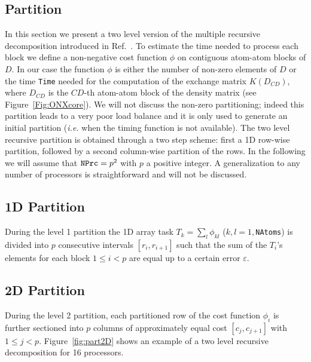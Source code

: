 \documentclass[prl,twocolumn,twocolumngrid,superbib]{revtex4} %
\begin{document}
\subsection{Partition}
 In this section we present a two level version of the multiple recursive 
 decomposition introduced in Ref.~\cite{LRomero95}.
 To estimate the time needed to process each block we define
 a non-negative cost function $\phi$ on contiguous atom-atom blocks of
 $D$. In our case the function $\phi$ is either the number of 
 non-zero elements of $D$ or the time {\tt Time} needed for the computation
 of the exchange matrix $K(D_{CD})$, where $D_{CD}$ is the
 $CD$-th atom-atom block of the density matrix (see Figure~\ref{Fig:ONXcore}).
 We will not discuss the non-zero partitioning;
 indeed this partition leads to a very poor load balance and it is
 only used to generate an initial partition ({\em i.e.} when 
 the timing function is not available). 
 The two level recursive partition is obtained through 
 a two step scheme: first a 1D row-wise partition, followed by a 
 second column-wise partition of the rows.
 In the following we will assume that ${\tt NPrc}=p^2$ with $p$ a positive integer. %
 A generalization to any number of processors is straightforward and will not be discussed.

\subsection{1D Partition}
 During the level 1 partition the 1D array task $T_k=\sum_l\phi_{kl}$ ($k,l=1,${\tt NAtoms})
 is divided into $p$ consecutive intervals $[r_i,r_{i+1}]$ such that the sum of the $T_i$'s elements for
 each block $1 \le i < p$ are equal up to a certain error $\varepsilon$. 

\subsection{2D Partition}
 During the level 2 partition, each partitioned row of the cost function $\phi_{i}$
 is further sectioned into $p$ columns of approximately equal cost $[c_j,c_{j+1}]$ with $1 \le j < p$.
 Figure~\ref{fig:part2D} shows an example of a two level recursive decomposition
 for 16 processors.
\end{document}
